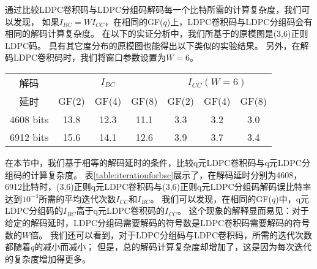 通过比较LDPC卷积码与LDPC分组码解码每一个比特所需的计算复杂度，我们可以发现，
如果$I_{BC}=WI_{CC}$，在相同的GF($q$)上，LDPC卷积码与LDPC分组码会有相同的解码计算复杂度。
在以下的实证分析中，我们所基于的原模图是(3,6)正则LDPC码。
具有其它度分布的原模图也能得出以下类似的实验结果。
另外，在解码LDPC卷积码时，我们将窗口参数设置为$W=6$。
\begin{center}
\label{table:iterationforbsc}
\begin{tabular}{|c|c|c|c|c|c|c|}
 \hline
解码 & \multicolumn{3}{|c|}{$I_{BC}$} & \multicolumn{3}{|c|}{$I_{CC}(W=6)$} \\ \cline{2-7}
延时 & GF(2) & GF(4) & GF(8) & GF(2) & GF(4) & GF(8) \\ \hline
4608 bits & 13.8 & 12.3 & 11.1 & 3.3 & 3.2 & 3.0\\ \hline
6912 bits & 15.6 & 14.1 & 12.6 & 3.9 & 3.7 & 3.4\\ \hline
\end{tabular}
\end{center}

在本节中，我们基于相等的解码延时的条件，比较q元LDPC卷积码与q元LDPC分组码的计算复杂度。
表\ref{table:iterationforbsc}展示了，在解码延时分别为4608，6912比特时，(3,6)正则q元LDPC卷积码与(3,6)正则q元LDPC分组码解码误比特率达到$10^{-4}$所需的平均迭代次数$I_{CC}$和$I_{BC}$。
我们可以发现，在相同的GF($q$)中，q元LDPC分组码的$I_{BC}$高于q元LDPC卷积码的$I_{CC}$。
这个现象的解释显而易见：对于给定的解码延时，LDPC分组码需要解码的符号数是LDPC卷积码需要解码的符号数的$W$倍。
我们还可以看到，对于LDPC分组码与LDPC卷积码，所需的迭代次数都随着$q$的减小而减小；
但是，总的解码计算复杂度却增加了，这是因为每次迭代的复杂度增加得更多。

\begin{center}
\label{fig:perbit}
\end{center}

